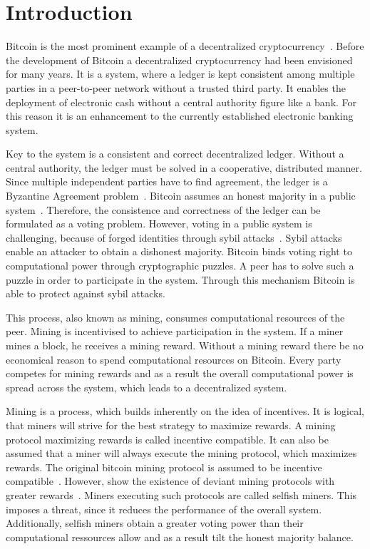 \chapter{Introduction}\label{chap:introduction}
Bitcoin is the most prominent example of a decentralized cryptocurrency~\cite{1}. Before the development of Bitcoin a decentralized cryptocurrency had been envisioned for many years. It is a system, where a ledger is kept consistent among multiple parties in a peer-to-peer network without a trusted third party. It enables the deployment of electronic cash without a central authority figure like a bank.
For this reason it is an enhancement to the currently established electronic banking system.

Key to the system is a consistent and correct decentralized ledger. Without a central authority, the ledger must be solved in a cooperative, distributed manner.
Since multiple independent parties have to find agreement, the ledger is a Byzantine Agreement problem~\cite{garay2015bitcoin}.
Bitcoin assumes an honest majority in a public system~\cite{tschorsch}. Therefore, the consistence and correctness of the ledger can be formulated as a voting problem. However, voting in a public system is challenging, because of forged identities through sybil attacks~\cite{sybil}. Sybil attacks enable an attacker to obtain a dishonest majority. Bitcoin binds voting right to computational power through cryptographic puzzles. A peer has to solve such a puzzle in order to participate in the system. Through this mechanism Bitcoin is able to protect against sybil attacks.

This process, also known as mining, consumes computational resources of the peer. Mining is incentivised to achieve participation in the system. If a miner mines a block, he receives a mining reward. Without a mining reward there be no economical reason to spend computational resources on Bitcoin. Every party competes for mining rewards and as a result the overall computational power is spread across the system, which leads to a decentralized system. 



Mining is a process, which builds inherently on the idea of incentives. It is logical, that miners will strive for the best strategy to maximize rewards. A mining protocol maximizing rewards is called incentive compatible. It can also be assumed that a miner will always execute the mining protocol, which maximizes rewards. The original bitcoin mining protocol is assumed to be incentive compatible~\cite{1}. However, \citeauthor{eyal} show the existence of deviant mining protocols with greater rewards~\cite{eyal}. Miners executing such protocols are called selfish miners. This imposes a threat, since it reduces the performance of the overall system. Additionally, selfish miners obtain a greater voting power than their computational ressources allow and as a result tilt the honest majority balance.

